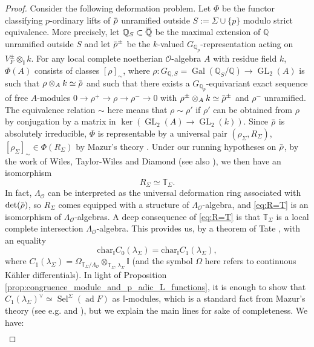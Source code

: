 \documentclass[12pt]{amsart}
\newcommand\bI{\mathbb{I}}
\newcommand\bQ{\mathbb{Q}}
\newcommand\bT{\mathbb{T}}
\newcommand\Qp{{\mathbb{Q}_p}}
\newcommand\cO{\mathcal{O}}
\newcommand{\ob}[1]{\mkern 1.5mu\overline{\mkern-1.5mu#1\mkern-1.5mu}\mkern 1.5mu}
\renewcommand{\char}{\textrm{char}}
\DeclareMathOperator{\Gal}{Gal}
\DeclareMathOperator{\ad}{ad}
\DeclareMathOperator{\GL}{GL}
\DeclareMathOperator{\Sel}{Sel}
\theoremstyle{defstyle}
\theoremstyle{thmstyle}
\begin{document}
\begin{proof}
Consider the following deformation problem. Let $\Phi$ be the functor classifying $p$-ordinary lifts of $\ob{\rho}$ unramified outside $S:=\Sigma\cup\{p\}$ modulo strict equivalence. 
More precisely, let $\bQ_S\subset \ob{\bQ}$ be the maximal extension of $\bQ$ unramified outside $S$ and let $\ob{\rho}^\pm$ be the $k$-valued $G_{\Qp}$-representation acting on $V_F^\pm\otimes_\bI k$.
For any local complete noetherian $\cO$-algebra $A$ with residue field $k$, $\Phi(A)$ consists of classes $[\rho]_\sim$, where $\rho \colon G_{\bQ,S}=\Gal(\bQ_S/\bQ) \to \GL_2(A)$ is such that $\rho \otimes_A k\simeq \ob{\rho}$ and such that there exists a $G_\Qp$-equivariant exact sequence of free $A$-modules $0 \to \rho^+ \to \rho \to \rho^-\to 0 $ with $\rho^\pm \otimes_{A} k\simeq \ob{\rho}^\pm$ and $\rho^-$ unramified. The equivalence relation $\sim$ here means that $\rho\sim\rho'$ if $\rho'$ can be obtained from $\rho$ by conjugation by a matrix in $\ker(\GL_2(A)\to\GL_2(k))$. Since $\ob{\rho}$ is absolutely irreducible, $\Phi$ is representable by a universal pair $(\rho_\Sigma,R_\Sigma)$, $[\rho_\Sigma]_\sim\in\Phi(R_\Sigma)$ by Mazur's theory \cite{mazurfermatbook}. 
Under our running hypotheses on $\ob{\rho}$, by the work of Wiles, Taylor-Wiles and Diamond \cite{wilesfermat,taylorwiles,diamond1996} (see also \cite[p. 539]{emerton2006variation}), we then have an isomorphism 
\begin{equation}\label{eq:R=T}
	R_\Sigma\simeq\bT_\Sigma.
\end{equation}
In fact, $\Lambda_\cO$ can be interpreted as the universal deformation ring associated with $\det(\ob{\rho})$, so $R_\Sigma$ comes equipped with a structure of $\Lambda_\cO$-algebra, and \eqref{eq:R=T} is an isomorphism of $\Lambda_\cO$-algebras. A deep consequence of \eqref{eq:R=T} is that $\bT_\Sigma$ is a local complete intersection $\Lambda_\cO$-algebra. This provides us, by a theorem of Tate \cite[Thm. 6.8]{hidapune}, with an equality 
\[\char_\bI C_0(\lambda_\Sigma)=\char_\bI C_1(\lambda_\Sigma),\]
where $C_1(\lambda_\Sigma)=\Omega_{\bT_\Sigma/\Lambda_\cO}\otimes_{\bT_\Sigma,\lambda_\Sigma} \bI$ (and the symbol $\Omega$ here refers to continuous Kähler differentials). In light of Proposition \ref{prop:congruence_module_and_p_adic_L_functions}, it is enough to show that $C_1(\lambda_\Sigma)^\vee\simeq\Sel^\Sigma(\ad F)$ as $\bI$-modules, which is a standard fact from Mazur's theory (see e.g. \cite[\S6]{mazurtilouine} and \cite[\S30]{mazurfermatbook}), but we explain the main lines for sake of completeness. We have:
\begin{align*}

\end{align*}
\end{proof}
\end{document}
